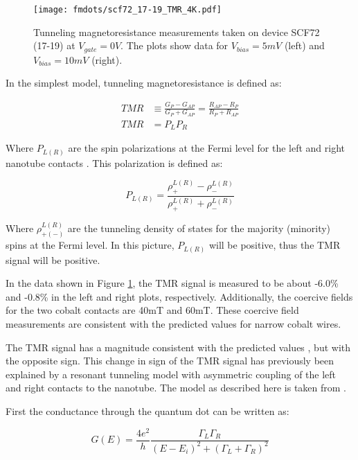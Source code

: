 \begin{figure}
    \centering
    \texttt{[image: fmdots/scf72\_17-19\_TMR\_4K.pdf]}
    \caption{Tunneling magnetoresistance measurements taken on device SCF72 (17-19) at $V_{gate} = 0V$. The plots show data for $V_{bias} = 5mV$ (left) and $V_{bias} = 10mV$ (right).}
    \label{fig:TMR_real}
\end{figure}

In the simplest model, tunneling magnetoresistance is defined as:

\begin{align}
    TMR &\equiv \frac{G_P - G_{AP}}{G_P + G_{AP}} = \frac{R_{AP} - R_{P}}{R_P + R_{AP}} \\
    TMR &= P_L P_R \label{eq:basic_tmr}
\end{align}

Where $P_{L(R)}$ are the spin polarizations at the Fermi level for the left and right nanotube contacts \cite{Maekawa1982}. This polarization is defined as:

\begin{equation}
    P_{L(R)} = \frac{\rho^{L(R)}_{+} - \rho^{L(R)}_{-}}{\rho^{L(R)}_{+} + \rho^{L(R)}_{-}}
\end{equation}

Where $\rho^{L(R)}_{+(-)}$ are the tunneling density of states for the majority (minority) spins at the Fermi level. In this picture, $P_{L(R)}$ will be positive, thus the TMR signal will be positive.

In the data shown in Figure \ref{fig:TMR_real}, the TMR signal is measured to be about -6.0\% and -0.8\% in the left and right plots, respectively. Additionally, the coercive fields for the two cobalt contacts are 40mT and 60mT. These coercive field measurements are consistent with the predicted values for narrow cobalt wires.

The TMR signal has a magnitude consistent with the predicted values \cite{Maekawa1982}, but with the opposite sign. This change in sign of the TMR signal has previously been explained by a resonant tunneling model with asymmetric coupling of the left and right contacts to the nanotube. The model as described here is taken from \cite{Tsymbal2003}.

First the conductance through the quantum dot can be written as:

\begin{equation}
\label{eq:tunnel_conductance}
    G(E) = \frac{4e^2}{h} \frac{\Gamma_L \Gamma_R}{(E-E_i)^2 + (\Gamma_L + \Gamma_R)^2}
\end{equation}

